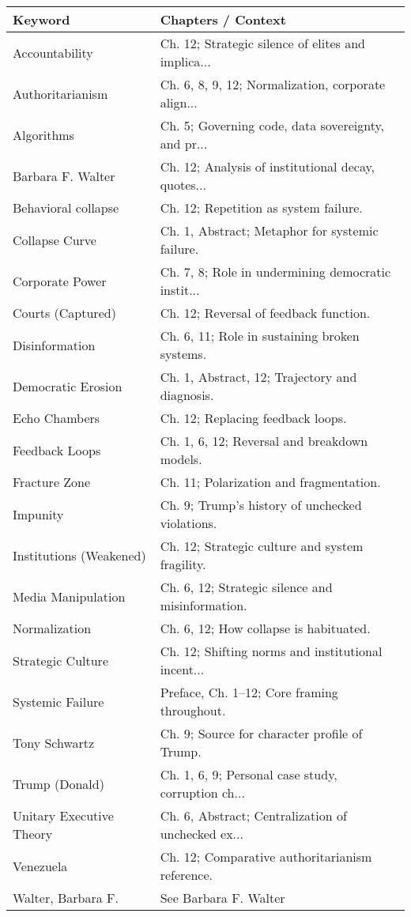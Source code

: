 \begin{tabular}{ll}
\toprule
                 Keyword &                                 Chapters / Context \\
\midrule
          Accountability & Ch. 12; Strategic silence of elites and implica... \\
        Authoritarianism & Ch. 6, 8, 9, 12; Normalization, corporate align... \\
              Algorithms & Ch. 5; Governing code, data sovereignty, and pr... \\
       Barbara F. Walter & Ch. 12; Analysis of institutional decay, quotes... \\
     Behavioral collapse &              Ch. 12; Repetition as system failure. \\
          Collapse Curve &    Ch. 1, Abstract; Metaphor for systemic failure. \\
         Corporate Power & Ch. 7, 8; Role in undermining democratic instit... \\
       Courts (Captured) &             Ch. 12; Reversal of feedback function. \\
          Disinformation &      Ch. 6, 11; Role in sustaining broken systems. \\
      Democratic Erosion &     Ch. 1, Abstract, 12; Trajectory and diagnosis. \\
           Echo Chambers &                  Ch. 12; Replacing feedback loops. \\
          Feedback Loops &       Ch. 1, 6, 12; Reversal and breakdown models. \\
           Fracture Zone &            Ch. 11; Polarization and fragmentation. \\
                Impunity &    Ch. 9; Trump’s history of unchecked violations. \\
 Institutions (Weakened) &    Ch. 12; Strategic culture and system fragility. \\
      Media Manipulation &   Ch. 6, 12; Strategic silence and misinformation. \\
           Normalization &             Ch. 6, 12; How collapse is habituated. \\
       Strategic Culture & Ch. 12; Shifting norms and institutional incent... \\
        Systemic Failure &        Preface, Ch. 1–12; Core framing throughout. \\
           Tony Schwartz &      Ch. 9; Source for character profile of Trump. \\
          Trump (Donald) & Ch. 1, 6, 9; Personal case study, corruption ch... \\
Unitary Executive Theory & Ch. 6, Abstract; Centralization of unchecked ex... \\
               Venezuela &    Ch. 12; Comparative authoritarianism reference. \\
      Walter, Barbara F. &                              See Barbara F. Walter \\
\bottomrule
\end{tabular}
